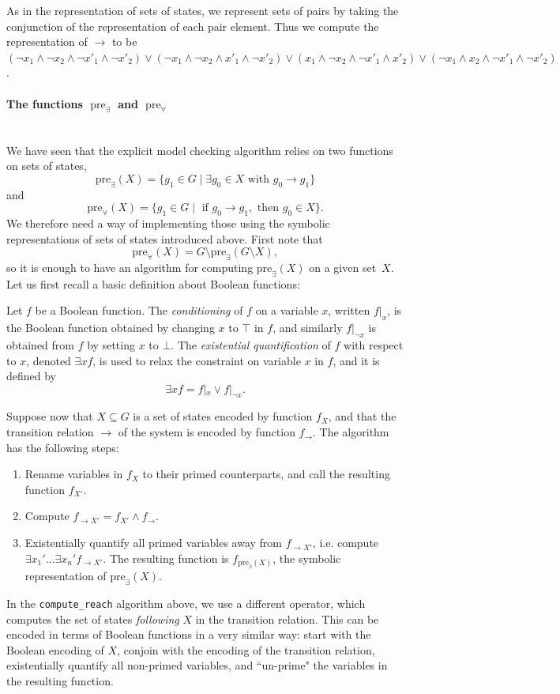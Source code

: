 \documentclass[11pt]{article}
\newenvironment{definition}[1][Definition]{\begin{trivlist}
\item[\hskip \labelsep {\bfseries #1}]}{\end{trivlist}}
\newcommand{\pre}{\mathop{\mathrm{pre}}}
\newcommand{\myparagraph}[1]{\paragraph{#1}\mbox{}\\}
\begin{document}
As in the representation of sets of states, we represent sets of pairs by taking the conjunction of the representation of each pair element. Thus we compute the representation of $\rightarrow$ to be $(\lnot x_1 \land \lnot x_2 \land \lnot x'_1 \land \lnot x'_2 ) \lor (\lnot x_1 \land \lnot x_2 \land x'_1 \land \lnot x'_2 ) \lor ( x_1 \land \lnot x_2 \land \lnot x'_1 \land  x'_2 ) \lor (\lnot x_1 \land x_2 \land \lnot x'_1 \land \lnot x'_2 )$.

\myparagraph{The functions $\pre_\exists$ and $\pre_\forall$}

We have seen that the explicit model checking algorithm relies on two functions on sets of states, $$\mbox{pre}_{\exists} (X) = \{g_1 \in G \mid \exists g_0 \in X \mbox{ with } g_0 \rightarrow g_1\}$$ and $$\mbox{pre}_\forall (X) = \{g_1 \in G \mid\mbox{ if }g_0 \rightarrow g_1,\mbox{ then }g_0 \in X\}.$$ We therefore need a way of implementing those using the symbolic representations of sets of states introduced above. First note that $$\mbox{pre}_\forall (X) = G \setminus \mbox{pre}_{\exists} (G \setminus X),$$ so it is enough to have an algorithm for computing $\mbox{pre}_{\exists}(X)$ on a given set~$X$. Let us first recall a basic definition about Boolean functions:

\begin{definition}
\label{exist}
Let $f$ be a Boolean function. The \textit{conditioning} of $f$ on a variable $x$, written $f|_x$, is the Boolean function obtained by changing $x$ to $\top$ in $f$, and similarly $f|_{\lnot x}$
is obtained from $f$ by setting $x$ to $\bot$.
The \textit{existential quantification} of $f$ with respect to $x$, denoted $\exists x f$, is used to relax the constraint on variable $x$ in $f$, and it is defined by $$\exists x f = f|_x \lor f|_{\lnot x}.$$
\end{definition}

Suppose now that $X \subseteq G$ is a set of states encoded by function $f_X$, and that the transition relation $\rightarrow$ of the system is encoded by function $f_\rightarrow$. The algorithm has the following steps:
\begin{enumerate}
\item Rename variables in $f_X$ to their primed counterparts, and call the resulting function $f_{X'}$. 
\item Compute $f_{\rightarrow X'} = f_{X'} \land f_\rightarrow$.
\item Existentially quantify all primed variables away from $f_{\rightarrow X'}$, i.e. compute $\exists x_1' ... \exists x_n' f_{\rightarrow X'}.$ The resulting function is $f_{\mbox{pre}_\exists(X)}$, the symbolic representation of $\mbox{pre}_\exists(X)$.
\end{enumerate}
In the \texttt{compute\_reach} algorithm above, we use a different operator, which computes the set of states \textit{following} $X$ in the transition relation. This can be encoded in terms of Boolean functions in a very similar way: start with the Boolean encoding of $X$, conjoin with the encoding of the transition relation, existentially quantify all non-primed variables, and ``un-prime" the variables in the resulting function.
\end{document}
